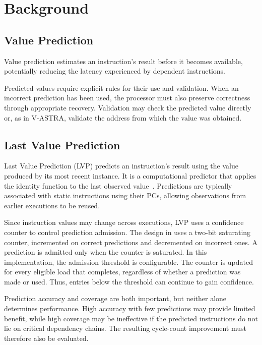 \section{Background}

\subsection{Value Prediction}

Value prediction estimates an instruction's result before it becomes
available, potentially reducing the latency experienced by dependent
instructions.

Predicted values require explicit rules for their use and validation.
When an incorrect prediction has been used, the processor must also
preserve correctness through appropriate recovery. Validation may
check the predicted value directly or, as in V-ASTRA, validate the
address from which the value was obtained.

\subsection{Last Value Prediction}

Last Value Prediction (LVP) predicts an instruction's result using
the value produced by its most recent instance. It is a computational
predictor that applies the identity function to the last observed
value~\cite{ravenel2025architecting}. Predictions are typically
associated with static instructions using their PCs, allowing
observations from earlier executions to be reused.

Since instruction values may change across executions, LVP uses a
confidence counter to control prediction admission. The design in
\cite{ravenel2025architecting} uses a two-bit saturating counter,
incremented on correct predictions and decremented on incorrect
ones. A prediction is admitted only when the counter is saturated.
In this implementation, the admission threshold is configurable.
The counter is updated for every eligible load that completes,
regardless of whether a prediction was made or used. Thus, entries
below the threshold can continue to gain confidence.

Prediction accuracy and coverage are both important, but neither
alone determines performance. High accuracy with few predictions
may provide limited benefit, while high coverage may be ineffective
if the predicted instructions do not lie on critical dependency
chains. The resulting cycle-count improvement must therefore also
be evaluated.

